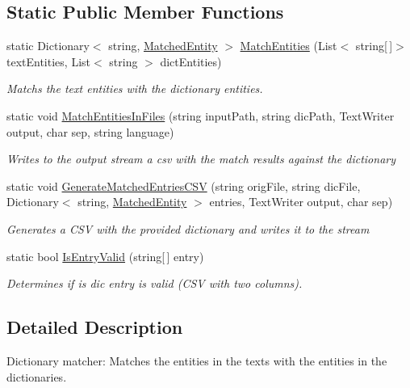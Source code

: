 \subsection*{Static Public Member Functions}
\begin{DoxyCompactItemize}
\item 
static Dictionary$<$ string, \hyperlink{class_a_t_p_r_n_e_r_1_1_matched_entity}{Matched\+Entity} $>$ \hyperlink{class_a_t_p_r_n_e_r_1_1_dictionary_matcher_aa6fdeaf3a88c14b5ed8e4f452d1c3c17}{Match\+Entities} (List$<$ string\mbox{[}$\,$\mbox{]}$>$ text\+Entities, List$<$ string $>$ dict\+Entities)
\begin{DoxyCompactList}\small\item\em Matchs the text entities with the dictionary entities. \end{DoxyCompactList}\item 
static void \hyperlink{class_a_t_p_r_n_e_r_1_1_dictionary_matcher_acb054c6ab6e27f9ea70e946671869d90}{Match\+Entities\+In\+Files} (string input\+Path, string dic\+Path, Text\+Writer output, char sep, string language)
\begin{DoxyCompactList}\small\item\em Writes to the output stream a csv with the match results against the dictionary \end{DoxyCompactList}\item 
static void \hyperlink{class_a_t_p_r_n_e_r_1_1_dictionary_matcher_a46c40a1214abf84cf7fd1981b193cddf}{Generate\+Matched\+Entries\+C\+SV} (string orig\+File, string dic\+File, Dictionary$<$ string, \hyperlink{class_a_t_p_r_n_e_r_1_1_matched_entity}{Matched\+Entity} $>$ entries, Text\+Writer output, char sep)
\begin{DoxyCompactList}\small\item\em Generates a C\+SV with the provided dictionary and writes it to the stream \end{DoxyCompactList}\item 
static bool \hyperlink{class_a_t_p_r_n_e_r_1_1_dictionary_matcher_a98d35fff3cf9f96fa1267ebdff6773d5}{Is\+Entry\+Valid} (string\mbox{[}$\,$\mbox{]} entry)
\begin{DoxyCompactList}\small\item\em Determines if is dic entry is valid (C\+SV with two columns). \end{DoxyCompactList}\end{DoxyCompactItemize}


\subsection{Detailed Description}
Dictionary matcher\+: Matches the entities in the texts with the entities in the dictionaries. 



